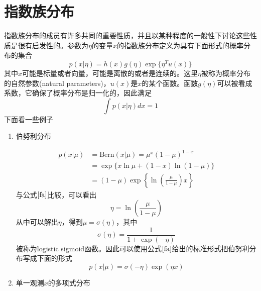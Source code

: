 \section{指数族分布}
指数族分布的成员有许多共同的重要性质，并且以某种程度的一般性下讨论这些性质是很有启发性的。参数为$\eta$的变量$x$的指数族分布定义为具有下面形式的概率分布的集合
\begin{equation}
\label{fa}
	p(x|\eta)=h(x)g(\eta)\exp\{\eta^Tu(x)\}
\end{equation}
其中$x$可能是标量或者向量，可能是离散的或者是连续的。这里$\eta$被称为概率分布的自然参数(natural parameters)，$u(x)$是$x$的某个函数。函数$g(\eta)$可以被看成系数，它确保了概率分布是归一化的，因此满足
\begin{equation}
	\int p(x|\eta)dx =1
\end{equation}
下面看一些例子
\begin{enumerate}
	\item 伯努利分布
	
	\begin{equation}
		\begin{aligned}
			p(x|\mu)&=\mathrm{Bern}(x|\mu)=\mu^x(1-\mu)^{1-x}\\
			&=\exp\{x\ln \mu +(1-x)\ln (1-\mu) \}\\
			&=(1-\mu)\exp\left\{\ln\left(\frac{\mu}{1-\mu} \right)x \right\}
		\end{aligned}
	\end{equation}
	与公式$\ref{fa}$比较，可以看出
	\begin{equation}
		\eta=\ln \left(\frac{\mu}{1-\mu}\right)
	\end{equation}
	从中可以解出$\eta$，得到$\mu=\sigma(\eta)$，其中
	\begin{equation}
		\sigma(\eta)=\frac{1}{1+\exp(-\eta)}
	\end{equation}
	被称为logistic sigmoid函数。因此可以使用公式$\ref{fa}$给出的标准形式把伯努利分布写成下面的形式
	\begin{equation}
		p(x|\mu)=\sigma(-\eta)\exp(\eta x)
	\end{equation}
	\item 单一观测$x$的多项式分布
	

\end{enumerate}
